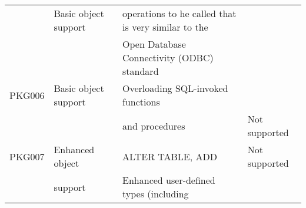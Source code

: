 \documentclass[10pt,twocolumn,fleqn]{article}
\begin{document}
\begin{tabular}{l | l | l| l |}
	&Basic object support	&operations to he called that is very similar to the	& \\
	&	 & Open Database Connectivity (ODBC) standard	& \\
PKG006	&Basic object support&Overloading SQL-invoked functions & \\
	&		& and procedures	& Not supported\\
PKG007	& Enhanced object&ALTER TABLE, ADD	& Not supported\\
	& support	&Enhanced user-defined types (including	& \\
\end{tabular}	
\end{document}
